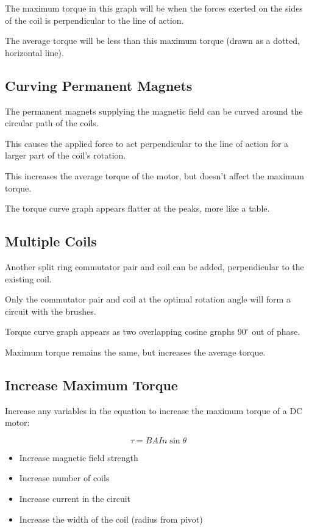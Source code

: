 \documentclass[a4paper,11pt]{report}
\begin{document}
The maximum torque in this graph will be when the forces exerted on the sides
of the coil is perpendicular to the line of action.

The average torque will be less than this maximum torque (drawn as a dotted,
horizontal line).

\subsection{Curving Permanent Magnets}

The permanent magnets supplying the magnetic field can be curved around the
circular path of the coils.

This causes the applied force to act perpendicular to the line of action for
a larger part of the coil's rotation.

This increases the average torque of the motor, but doesn't affect the maximum
torque.

The torque curve graph appears flatter at the peaks, more like a table.

\subsection{Multiple Coils}

Another split ring commutator pair and coil can be added, perpendicular to the
existing coil.

Only the commutator pair and coil at the optimal rotation angle will form a
circuit with the brushes.

Torque curve graph appears as two overlapping cosine graphs $90^\circ$ out of
phase.

Maximum torque remains the same, but increases the average torque.

\subsection{Increase Maximum Torque}

Increase any variables in the equation to increase the maximum torque of a DC
motor:

$$
\tau = B A I n \sin{\theta}
$$

\begin{itemize}
\item Increase magnetic field strength
\item Increase number of coils
\item Increase current in the circuit
\item Increase the width of the coil (radius from pivot)
\end{itemize}
\end{document}
